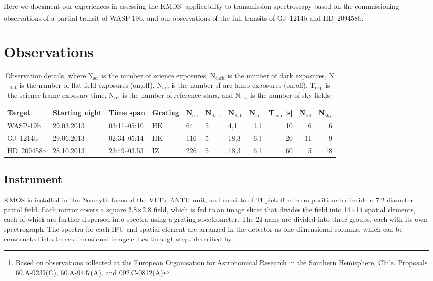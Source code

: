 \documentclass[useAMS,usenatbib]{mn2e}
\begin{document}
Here we document our experiences in assessing the KMOS' applicability to transmission spectroscopy based on the 
commissioning observations of a partial transit of WASP-19b, and our observations of the full transits of GJ~1214b and 
HD~209458b.$\!$\footnote{Based on observations collected at the European Organisation for Astronomical Research in the
Southern Hemisphere, Chile. Proposals 60.A-9239(C), 60.A-9447(A), and 092.C-0812(A)}


\section{Observations}
\label{sec:observations}

\begin{table}[htp]
  \centering
    \begin{tabularx}{\textwidth}{@{\extracolsep\fill}lllllllrrrr}
    \toprule
    Target & Starting night & Time span & Grating & N$_{\mathrm{sci}}$ & N$_{\mathrm{dark}}$ & N$_{\mathrm{flat}}$ & 
N$_{\mathrm{arc}}$ &T$_{\mathrm{exp}}$ [s] & N$_{\mathrm{ref}}$ & N$_{\mathrm{sky}}$ \\
    \midrule
    WASP-19b   & 29.03.2013 & 03:11--05:10 & HK & 64  & 5 &  4,1 & 1,1 & 10 &  6 & 6 \\
    GJ~1214b   & 29.06.2013 & 02:34--05:14 & HK & 116 & 5 & 18,3 & 6,1 & 20 & 11 & 9 \\
    HD~209458b & 28.10.2013 & 23:49--03.53 & IZ & 226 & 5 & 18,3 & 6,1 & 60 &  5 & 18 \\
    \bottomrule
  \end{tabularx}
  \caption{Observation details, where N$_{\mathrm{sci}}$ is the number of science exposures, N$_{\mathrm{dark}}$ is the 
number of dark exposures, N$_{\mathrm{flat}}$ is the number of flat field exposures (on,off), N$_{\mathrm{arc}}$ is the 
number of arc lamp exposures (on,off), T$_{\mathrm{exp}}$ is the science frame exposure time, N$_{\mathrm{ref}}$ is the 
number of reference stars, and N$_{\mathrm{sky}}$ is the number of sky fields.}
  \label{tab:observations}
\end{table}

\subsection{Instrument}
\label{sec:observations:instrument}
KMOS \citep{Sharples2013} is installed in the Nasmyth-focus of the VLT's ANTU unit, and consists of 24 pickoff mirrors
positionable inside a 7.2\arcmin{} diameter patrol field. Each mirror covers a square 2.8\arcsec$\times$2.8\arcsec{}
field, which is fed to an image slicer that divides the field into 14$\times$14 spatial elements, each of which are
further dispersed into spectra using a grating spectrometer. The 24 arms are divided into three groups, each with its
own spectrograph. The spectra for each IFU and spatial element are arranged in the detector as one-dimensional columns,
which can be constructed into three-dimensional image cubes through steps described by \citet{Davies2013}.
\end{document}
